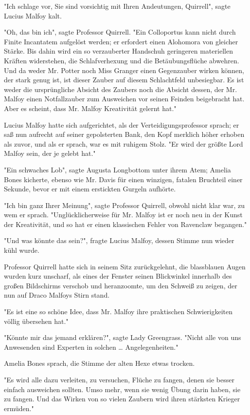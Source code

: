 {"Ich schlage vor, Sie sind vorsichtig mit Ihren Andeutungen, Quirrell", sagte Lucius Malfoy kalt.

"Oh, das bin ich", sagte Professor Quirrell. "Ein Colloportus kann nicht durch Finite Incantatem aufgelöst werden; er erfordert einen Alohomora von gleicher Stärke. Bis dahin wird ein so verzauberter Handschuh geringeren materiellen Kräften widerstehen, die Schlafverhexung und die Betäubungsflüche abwehren. Und da weder Mr. Potter noch Miss Granger einen Gegenzauber wirken können, der stark genug ist, ist dieser Zauber auf diesem Schlachtfeld unbesiegbar. Es ist weder die ursprüngliche Absicht des Zaubers noch die Absicht dessen, der Mr. Malfoy einen Notfallzauber zum Ausweichen vor seinen Feinden beigebracht hat. Aber es scheint, dass Mr. Malfoy Kreativität gelernt hat."

Lucius Malfoy hatte sich aufgerichtet, als der Verteidigungsprofessor sprach; er saß nun aufrecht auf seiner gepolsterten Bank, den Kopf merklich höher erhoben als zuvor, und als er sprach, war es mit ruhigem Stolz. "Er wird der größte Lord Malfoy sein, der je gelebt hat."

"Ein schwaches Lob", sagte Augusta Longbottom unter ihrem Atem; Amelia Bones kicherte, ebenso wie Mr. Davis für einen winzigen, fatalen Bruchteil einer Sekunde, bevor er mit einem erstickten Gurgeln aufhörte.

"Ich bin ganz Ihrer Meinung", sagte Professor Quirrell, obwohl nicht klar war, zu wem er sprach. "Unglücklicherweise für Mr. Malfoy ist er noch neu in der Kunst der Kreativität, und so hat er einen klassischen Fehler von Ravenclaw begangen."

"Und was könnte das sein?", fragte Lucius Malfoy, dessen Stimme nun wieder kühl wurde.

Professor Quirrell hatte sich in seinem Sitz zurückgelehnt, die blassblauen Augen wurden kurz unscharf, als eines der Fenster seinen Blickwinkel innerhalb des großen Bildschirms verschob und heranzoomte, um den Schweiß zu zeigen, der nun auf Draco Malfoys Stirn stand.

"Es ist eine so schöne Idee, dass Mr. Malfoy ihre praktischen Schwierigkeiten völlig übersehen hat."

"Könnte mir das jemand erklären?", sagte Lady Greengrass. "Nicht alle von uns Anwesenden sind Experten in solchen … Angelegenheiten."

Amelia Bones sprach, die Stimme der alten Hexe etwas trocken.

"Es wird alle dazu verleiten, zu versuchen, Flüche zu fangen, denen sie besser einfach ausweichen sollten. Umso mehr, wenn sie wenig Übung darin haben, sie zu fangen. Und das Wirken von so vielen Zaubern wird ihren stärksten Krieger ermüden."

}
